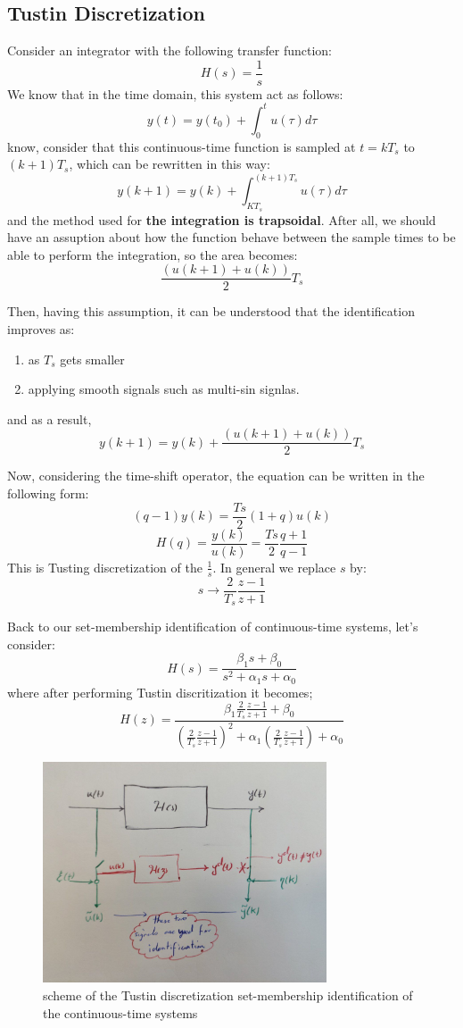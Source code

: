 \subsection{Tustin Discretization}
Consider an integrator with the following transfer function:
\[
H(s) = \frac{1}{s}
\]
We know that in the time domain, this system act as follows:
\[
y(t) = y(t_0) + \int_{0}^{t} u(\tau)d\tau
\]
know, consider that this continuous-time function is sampled at $t = k T_s$ to $(k+1) T_s$, which can be rewritten in this way:
\[
y(k+1) = y(k) + \int_{K T_s}^{(k+1)T_s} u(\tau)d\tau
\]
and the method used for \textbf{the integration is trapsoidal}. After all, we should have an assuption about how the function behave between the sample times to be able to perform the integration, so the area becomes:
\[
\frac{(u(k+1) + u(k))}{2}T_s
\]
\begin{factbox}
Then, having this assumption, it can be understood that the identification improves as:
\begin{enumerate}
    \item as $T_s$ gets smaller
    \item applying smooth signals such as multi-sin signlas.
\end{enumerate}
\end{factbox}
and as a result,
\[
y(k+1) = y(k) + \frac{(u(k+1) + u(k))}{2}T_s
\]

Now, considering the time-shift operator, the equation can be written in the following form:
\[
(q-1) y(k) = \frac{Ts}{2}(1+q)u(k)
\]
\[
H(q) = \frac{y(k)}{u(k)} = \frac{Ts}{2} \frac{q+1}{q-1}
\]
This is Tusting discretization of the $\frac{1}{s}$. In general we replace $s$ by:
\[
s \rightarrow \frac{2}{T_s}\frac{z-1}{z+1}
\]

Back to our set-membership identification of continuous-time systems, let's consider:
\[
H(s) = \frac{\beta_1 s + \beta_0}{s^2 + \alpha_1 s + \alpha_0 }
\]
where after performing Tustin discritization it becomes;
\[
H(z) = \frac{\beta_1 \frac{2}{T_s}\frac{z-1}{z+1}+ \beta_0}{(\frac{2}{T_s}\frac{z-1}{z+1})^2 + \alpha_1 (\frac{2}{T_s}\frac{z-1}{z+1}) + \alpha_0}
\]

\begin{figure}[htbp] 
    \centering
    \includegraphics[width=0.75\textwidth]{images/tustin-discritization.jpg}
    \caption{scheme of the Tustin discretization set-membership identification of the continuous-time systems}
    \label{fig:FPS_time_domain}
\end{figure}

